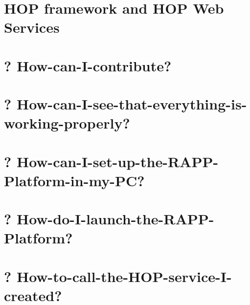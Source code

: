 \documentclass[twoside]{book}
\begin{document}
\chapter{H\-O\-P framework and H\-O\-P Web Services}
\label{md_rapp-platform_8wiki_HOP-Services---General-Information}
\hypertarget{md_rapp-platform_8wiki_HOP-Services---General-Information}{}

\chapter{? How-\/can-\/\-I-\/contribute?}
\label{md_rapp-platform_8wiki_How-can-I-contribute}
\hypertarget{md_rapp-platform_8wiki_How-can-I-contribute}{}

\chapter{? How-\/can-\/\-I-\/see-\/that-\/everything-\/is-\/working-\/properly?}
\label{md_rapp-platform_8wiki_How-can-I-see-that-everything-is-working-properly}
\hypertarget{md_rapp-platform_8wiki_How-can-I-see-that-everything-is-working-properly}{}

\chapter{? How-\/can-\/\-I-\/set-\/up-\/the-\/\-R\-A\-P\-P-\/\-Platform-\/in-\/my-\/\-P\-C?}
\label{md_rapp-platform_8wiki_How-can-I-set-up-the-RAPP-Platform-in-my-PC}
\hypertarget{md_rapp-platform_8wiki_How-can-I-set-up-the-RAPP-Platform-in-my-PC}{}

\chapter{? How-\/do-\/\-I-\/launch-\/the-\/\-R\-A\-P\-P-\/\-Platform?}
\label{md_rapp-platform_8wiki_How-do-I-launch-the-RAPP-Platform}
\hypertarget{md_rapp-platform_8wiki_How-do-I-launch-the-RAPP-Platform}{}

\chapter{? How-\/to-\/call-\/the-\/\-H\-O\-P-\/service-\/\-I-\/created?}
\label{md_rapp-platform_8wiki_How-to-call-the-HOP-service-I-created}
\hypertarget{md_rapp-platform_8wiki_How-to-call-the-HOP-service-I-created}{}

\end{document}
